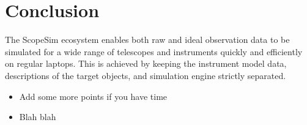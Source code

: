 

\section{Conclusion%
  \label{conclusion}%
}

The ScopeSim ecosystem enables both raw and ideal observation data to be simulated for a wide range of telescopes and instruments quickly and efficiently on regular laptops.
This is achieved by keeping the instrument model data, descriptions of the target objects, and simulation engine strictly separated.

\begin{itemize}
\item Add some more points if you have time

\item Blah blah
\end{itemize}
